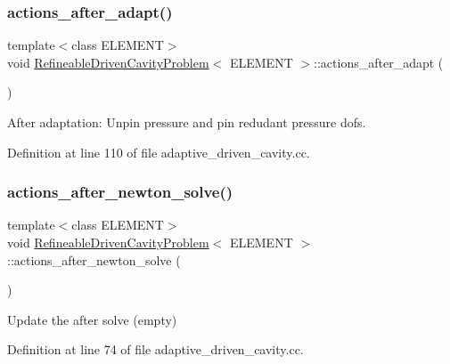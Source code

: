 \subsubsection{\texorpdfstring{actions\+\_\+after\+\_\+adapt()}{actions\_after\_adapt()}}
{\footnotesize\ttfamily template$<$class E\+L\+E\+M\+E\+NT$>$ \\
void \hyperlink{classRefineableDrivenCavityProblem}{Refineable\+Driven\+Cavity\+Problem}$<$ E\+L\+E\+M\+E\+NT $>$\+::actions\+\_\+after\+\_\+adapt (\begin{DoxyParamCaption}{ }\end{DoxyParamCaption})\hspace{0.3cm}{\ttfamily [inline]}}



After adaptation\+: Unpin pressure and pin redudant pressure dofs. 



Definition at line 110 of file adaptive\+\_\+driven\+\_\+cavity.\+cc.

\mbox{\label{classRefineableDrivenCavityProblem_a168df1ad7b08cf8b760b6d56e9920479}} 
\subsubsection{\texorpdfstring{actions\+\_\+after\+\_\+newton\+\_\+solve()}{actions\_after\_newton\_solve()}}
{\footnotesize\ttfamily template$<$class E\+L\+E\+M\+E\+NT$>$ \\
void \hyperlink{classRefineableDrivenCavityProblem}{Refineable\+Driven\+Cavity\+Problem}$<$ E\+L\+E\+M\+E\+NT $>$\+::actions\+\_\+after\+\_\+newton\+\_\+solve (\begin{DoxyParamCaption}{ }\end{DoxyParamCaption})\hspace{0.3cm}{\ttfamily [inline]}}



Update the after solve (empty) 



Definition at line 74 of file adaptive\+\_\+driven\+\_\+cavity.\+cc.

